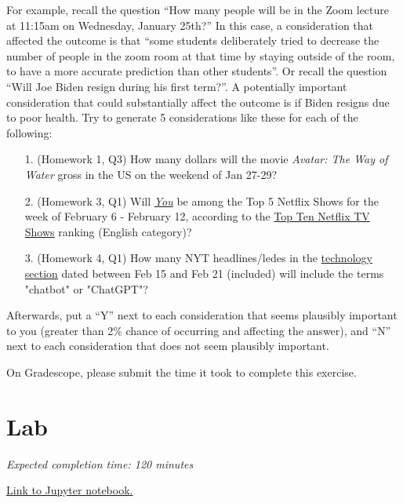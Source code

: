 \documentclass[11pt]{article}
\begin{document}
For example, recall the question ``How many people will be in the Zoom lecture at 11:15am on Wednesday, January 25th?'' In this case, a consideration that affected the outcome is that ``some students deliberately tried to decrease the number of people in the zoom room at that time by staying outside of the room, to have a more accurate prediction than other students''. Or recall the question ``Will Joe Biden resign during his first term?''. A potentially important consideration that could substantially affect the outcome is if Biden resigns due to poor health. Try to generate 5 considerations like these for each of the following:

\begin{enumerate}
	\item[1.] (Homework 1, Q3) How many dollars will the movie \emph{Avatar: The Way of Water} gross in the US on the weekend of Jan 27-29?

	\item[2.] (Homework 3, Q1) Will \href{https://en.wikipedia.org/wiki/You_(TV_series)}{\emph{You}} be among the Top 5 Netflix Shows for the week of February 6 - February 12, according to the \href{https://top10.netflix.com/tv}{Top Ten Netflix TV Shows} ranking (English category)? 

	\item[3.] (Homework 4, Q1) How many NYT headlines/ledes in the \href{https://www.nytimes.com/section/technology}{technology section} dated between Feb 15 and Feb 21 (included) will include the terms "chatbot" or "ChatGPT"?

\end{enumerate}

Afterwards, put a ``Y'' next to each consideration that seems plausibly important to you (greater than 2\% chance of occurring and affecting the answer), 
and ``N'' next to each consideration that does not seem plausibly important.

On Gradescope, please submit the time it took to complete this exercise.

\section*{Lab}

\emph{Expected completion time: 120 minutes}

\href{http://datahub.berkeley.edu/hub/user-redirect/git-pull?repo=https%3A%2F%2Fgithub.com%2Fjs-d%2Fforecasting-class-sp23&urlpath=tree%2Fforecasting-class-sp23%2Fhw%2Fhw4%2Fhw4lab.ipynb&branch=main}{Link to Jupyter notebook.}
\end{document}
